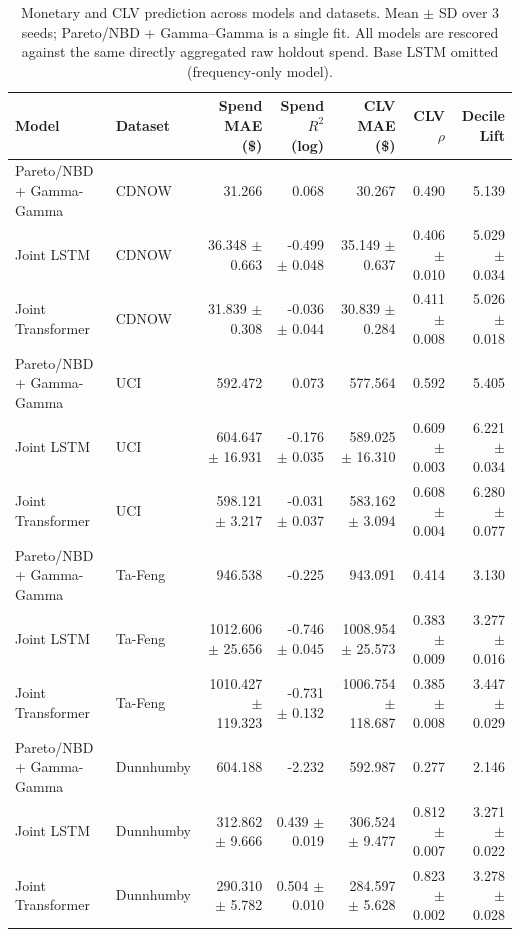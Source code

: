 \begin{table}[htbp]
\centering
\small
\setlength{\tabcolsep}{4pt}
\caption{Monetary and CLV prediction across models and datasets. Mean $\pm$ SD over 3 seeds; Pareto/NBD + Gamma--Gamma is a single fit. All models are rescored against the same directly aggregated raw holdout spend. Base LSTM omitted (frequency-only model).}
\label{tab:monetary_clv}
\begin{tabular}{llrrrrr}
\toprule
Model & Dataset & Spend MAE (\$) & Spend $R^2$ (log) & CLV MAE (\$) & CLV $\rho$ & Decile Lift \\
\midrule
Pareto/NBD + Gamma-Gamma & CDNOW & 31.266 & 0.068 & 30.267 & 0.490 & 5.139 \\
Joint LSTM & CDNOW & 36.348 $\pm$ 0.663 & -0.499 $\pm$ 0.048 & 35.149 $\pm$ 0.637 & 0.406 $\pm$ 0.010 & 5.029 $\pm$ 0.034 \\
Joint Transformer & CDNOW & 31.839 $\pm$ 0.308 & -0.036 $\pm$ 0.044 & 30.839 $\pm$ 0.284 & 0.411 $\pm$ 0.008 & 5.026 $\pm$ 0.018 \\
\midrule
Pareto/NBD + Gamma-Gamma & UCI & 592.472 & 0.073 & 577.564 & 0.592 & 5.405 \\
Joint LSTM & UCI & 604.647 $\pm$ 16.931 & -0.176 $\pm$ 0.035 & 589.025 $\pm$ 16.310 & 0.609 $\pm$ 0.003 & 6.221 $\pm$ 0.034 \\
Joint Transformer & UCI & 598.121 $\pm$ 3.217 & -0.031 $\pm$ 0.037 & 583.162 $\pm$ 3.094 & 0.608 $\pm$ 0.004 & 6.280 $\pm$ 0.077 \\
\midrule
Pareto/NBD + Gamma-Gamma & Ta-Feng & 946.538 & -0.225 & 943.091 & 0.414 & 3.130 \\
Joint LSTM & Ta-Feng & 1012.606 $\pm$ 25.656 & -0.746 $\pm$ 0.045 & 1008.954 $\pm$ 25.573 & 0.383 $\pm$ 0.009 & 3.277 $\pm$ 0.016 \\
Joint Transformer & Ta-Feng & 1010.427 $\pm$ 119.323 & -0.731 $\pm$ 0.132 & 1006.754 $\pm$ 118.687 & 0.385 $\pm$ 0.008 & 3.447 $\pm$ 0.029 \\
\midrule
Pareto/NBD + Gamma-Gamma & Dunnhumby & 604.188 & -2.232 & 592.987 & 0.277 & 2.146 \\
Joint LSTM & Dunnhumby & 312.862 $\pm$ 9.666 & 0.439 $\pm$ 0.019 & 306.524 $\pm$ 9.477 & 0.812 $\pm$ 0.007 & 3.271 $\pm$ 0.022 \\
Joint Transformer & Dunnhumby & 290.310 $\pm$ 5.782 & 0.504 $\pm$ 0.010 & 284.597 $\pm$ 5.628 & 0.823 $\pm$ 0.002 & 3.278 $\pm$ 0.028 \\
\bottomrule
\end{tabular}
\end{table}